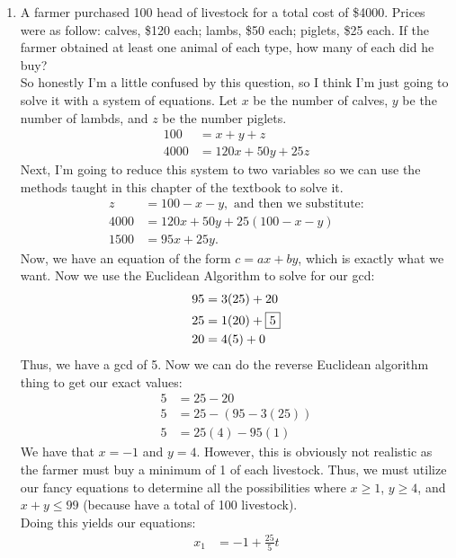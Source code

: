 \documentclass[10pt,oneside]{book}
\newcommand{\gspc}{\vspace{0.13cm}} %
\newcommand{\gline}{\gspc\\} %
\begin{document}
\begin{enumerate}
\begin{enumerate}
\begin{enumerate}
\begin{align*}
				y_n &= \{2, 20, 38\}
			\end{align*}
			With each solution paired respectively (e.g. (16, 2))
			\pagebreak
		\end{enumerate}
	\end{enumerate}
	\item[6.] A farmer purchased 100 head of livestock for a total cost of \$4000. Prices were as follow: calves, \$120 each; lambs, \$50 each; piglets, \$25 each. If the farmer obtained at least one animal of each type, how many of each did he buy?\gline
	So honestly I'm a little confused by this question, so I think I'm just going to solve it with a system of equations. Let $x$ be the number of calves, $y$ be the number of lambds, and $z$ be the number piglets.
	\begin{align*}
		100 &= x + y + z\\
		4000&= 120x + 50y + 25z
	\end{align*}
	Next, I'm going to reduce this system to two variables so we can use the methods taught in this chapter of the textbook to solve it.
	\begin{align*}
		z&= 100 - x - y, \text{ and then we substitute:} \\
		4000 &= 120 x + 50y + 25(100 - x - y)\\
		1500 &= 95x +25y.
	\end{align*}
	Now, we have an equation of the form $c = ax + by$, which is exactly what we want. Now we use the Euclidean Algorithm to solve for our gcd:
	\begin{align*}
		95 &= 3(25) + 20\\
		25 &= 1(20) + \fbox 5\\
		20 &= 4(5) + 0
	\end{align*}
	Thus, we have a gcd of 5. Now we can do the reverse Euclidean algorithm thing to get our exact values:
	\begin{align*}
		5&= 25 - 20\\
		5 &= 25 - (95 - 3(25))\\
		5 &= 25(4) - 95(1)
	\end{align*}
	We have that  $x = -1$ and $y = 4$. However, this is obviously not realistic as the farmer must buy a minimum of 1 of each livestock. Thus, we must utilize our fancy equations to determine all the possibilities where $x\ge 1$, $y \ge 4$, and $x+y \le 99$ (because have a total of 100 livestock). \gline
	Doing this yields our equations:
	\begin{align*}
		x_1 &= -1 + \frac{25}5t\\

\end{align*}
\end{enumerate}
\end{document}
